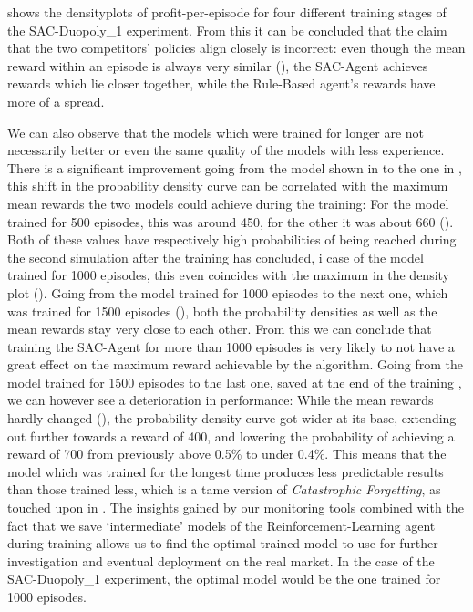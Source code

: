  shows the densityplots of profit-per-episode for four different training stages of the SAC-Duopoly\_1 experiment. From this it can be concluded that the claim that the two competitors' policies align closely is incorrect: even though the mean reward within an episode is always very similar (), the SAC-Agent achieves rewards which lie closer together, while the Rule-Based agent's rewards have more of a spread.

We can also observe that the models which were trained for longer are not necessarily better or even the same quality of the models with less experience. There is a significant improvement going from the model shown in  to the one in , this shift in the probability density curve can be correlated with the maximum mean rewards the two models could achieve during the training: For the model trained for 500 episodes, this was around 450, for the other it was about 660 (). Both of these values have respectively high probabilities of being reached during the second simulation after the training has concluded, i case of the model trained for 1000 episodes, this even coincides with the maximum in the density plot (). Going from the model trained for 1000 episodes to the next one, which was trained for 1500 episodes (), both the probability densities as well as the mean rewards stay very close to each other. From this we can conclude that training the SAC-Agent for more than 1000 episodes is very likely to not have a great effect on the maximum reward achievable by the algorithm. Going from the model trained for 1500 episodes to the last one, saved at the end of the training , we can however see a deterioration in performance: While the mean rewards hardly changed (), the probability density curve got wider at its base, extending out further towards a reward of 400, and lowering the probability of achieving a reward of 700 from previously above 0.5\% to under 0.4\%. This means that the model which was trained for the longest time produces less predictable results than those trained less, which is a tame version of \emph{Catastrophic Forgetting}, as touched upon in . The insights gained by our monitoring tools combined with the fact that we save `intermediate' models of the Reinforcement-Learning agent during training allows us to find the optimal trained model to use for further investigation and eventual deployment on the real market. In the case of the SAC-Duopoly\_1 experiment, the optimal model would be the one trained for 1000 episodes.

